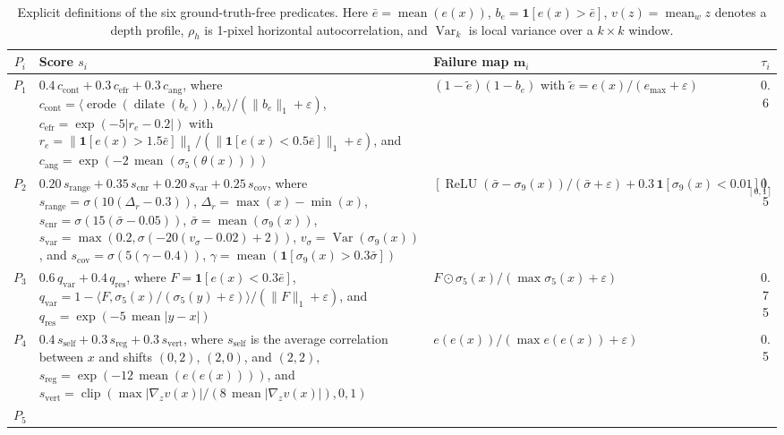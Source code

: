 \documentclass{ieeetj}
\begin{document}
\begin{table}[t]
\centering
\caption{Explicit definitions of the six ground-truth-free predicates. Here $\bar e=\operatorname{mean}(e(x))$, $b_e=\mathbf{1}[e(x)>\bar e]$, $v(z)=\operatorname{mean}_w z$ denotes a depth profile, $\rho_h$ is 1-pixel horizontal autocorrelation, and $\operatorname{Var}_k$ is local variance over a $k\times k$ window.}
\label{tab:predicates}
\setlength{\tabcolsep}{3pt}
\small
\begin{tabular}{cp{}p{}c}
\toprule
$P_i$ & Score $s_i$ & Failure map $\mathbf{m}_i$ & $\tau_i$ \\
\midrule
$P_1$ &
$0.4\,c_{\text{cont}}+0.3\,c_{\text{efr}}+0.3\,c_{\text{ang}}$, where $c_{\text{cont}}=\langle\operatorname{erode}(\operatorname{dilate}(b_e)),b_e\rangle/(\|b_e\|_1+\varepsilon)$, $c_{\text{efr}}=\exp(-5|r_e-0.2|)$ with $r_e=\|\mathbf{1}[e(x)>1.5\bar e]\|_1/(\|\mathbf{1}[e(x)<0.5\bar e]\|_1+\varepsilon)$, and $c_{\text{ang}}=\exp(-2\,\operatorname{mean}(\sigma_5(\theta(x))))$ &
$(1-\tilde e)(1-b_e)$ with $\tilde e=e(x)/(e_{\max}+\varepsilon)$ &
0.6 \\
$P_2$ &
$0.20\,s_{\text{range}}+0.35\,s_{\text{cnr}}+0.20\,s_{\text{var}}+0.25\,s_{\text{cov}}$, where $s_{\text{range}}=\sigma(10(\Delta_r-0.3))$, $\Delta_r=\max(x)-\min(x)$, $s_{\text{cnr}}=\sigma(15(\bar\sigma-0.05))$, $\bar\sigma=\operatorname{mean}(\sigma_9(x))$, $s_{\text{var}}=\max(0.2,\sigma(-20(v_\sigma-0.02)+2))$, $v_\sigma=\operatorname{Var}(\sigma_9(x))$, and $s_{\text{cov}}=\sigma(5(\gamma-0.4))$, $\gamma=\operatorname{mean}(\mathbf{1}[\sigma_9(x)>0.3\bar\sigma])$ &
$[\operatorname{ReLU}(\bar\sigma-\sigma_9(x))/(\bar\sigma+\varepsilon)+0.3\,\mathbf{1}[\sigma_9(x)<0.01]]_{[0,1]}$ &
0.5 \\
$P_3$ &
$0.6\,q_{\text{var}}+0.4\,q_{\text{res}}$, where $F=\mathbf{1}[e(x)<0.3\bar e]$, $q_{\text{var}}=1-\langle F,\sigma_5(x)/(\sigma_5(y)+\varepsilon)\rangle/(\|F\|_1+\varepsilon)$, and $q_{\text{res}}=\exp(-5\,\operatorname{mean}|y-x|)$ &
$F \odot \sigma_5(x)/(\max \sigma_5(x)+\varepsilon)$ &
0.75 \\
$P_4$ &
$0.4\,s_{\text{self}}+0.3\,s_{\text{reg}}+0.3\,s_{\text{vert}}$, where $s_{\text{self}}$ is the average correlation between $x$ and shifts $(0,2)$, $(2,0)$, and $(2,2)$, $s_{\text{reg}}=\exp(-12\,\operatorname{mean}(e(e(x))))$, and $s_{\text{vert}}=\operatorname{clip}(\max |\nabla_z v(x)|/(8\,\operatorname{mean}|\nabla_z v(x)|),0,1)$ &
$e(e(x))/(\max e(e(x))+\varepsilon)$ &
0.5 \\
$P_5$ &

\end{tabular}
\end{table}
\end{document}
